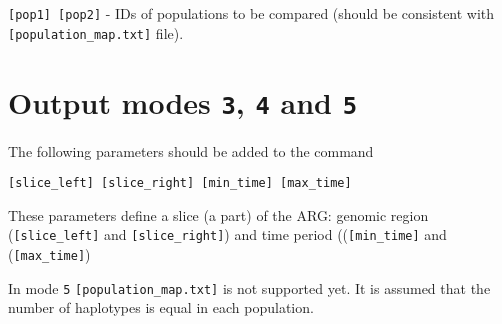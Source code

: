 \documentclass[11pt]{amsart}
\theoremstyle{definition}
\theoremstyle{remark}
\begin{document}
	\texttt{[pop1] [pop2]} - IDs of populations to be compared (should be consistent with \texttt{[population\_map.txt]} file).

\section{Output modes \texttt{3}, \texttt{4}  and \texttt{5} }
	The following parameters should be added to the command
	\begin{displayquote}
		\texttt{[slice\_left] [slice\_right] [min\_time] [max\_time]}
	\end{displayquote}
	These parameters define a slice (a part) of the ARG: genomic region (\texttt{[slice\_left]} and \texttt{[slice\_right]}) and time period ((\texttt{[min\_time]} and (\texttt{[max\_time]})
	
	In mode \texttt{5} \texttt{[population\_map.txt]} is not supported yet. It is assumed that the number of haplotypes is equal in each population.
	
\end{document}
